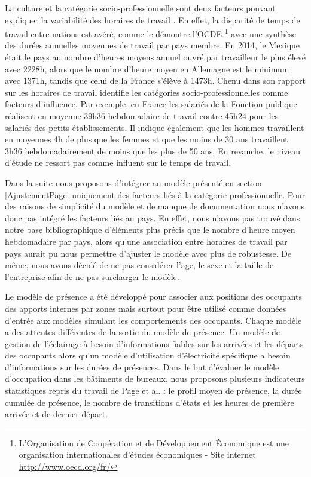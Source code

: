 La culture et la catégorie socio-professionnelle sont deux facteurs pouvant expliquer la variabilité des horaires de travail \cite{Annex-53-1}. En effet, la disparité de temps de travail entre nations est avéré, comme le démontre l'OCDE \footnote{L'Organisation de Coopération et de Développement Économique est une organisation internationales d'études économiques - Site internet \url{http://www.oecd.org/fr/}}\cite{OECD-14} avec une synthèse des durées annuelles moyennes de travail par pays membre. En 2014, le Mexique était le pays au nombre d'heures moyens annuel ouvré par travailleur le plus élevé avec 2228h, alors que le nombre d'heure moyen en Allemagne est le minimum avec 1371h, tandis que celui de la France s'élève à 1473h. Chenu \cite{Chenu-02} dans son rapport sur les horaires de travail identifie les catégories socio-professionnelles comme facteurs d'influence. Par exemple, en France les salariés de la Fonction publique réalisent en moyenne 39h36 hebdomadaire de travail contre 45h24 pour les salariés des petits établissements. Il indique également que les hommes travaillent en moyennes 4h de plus que les femmes et que les moins de 30 ans travaillent 3h36 hebdomadairement de moins que les plus de 50 ans. En revanche, le niveau d'étude ne ressort pas comme influent sur le temps de travail.

Dans la suite nous proposons d'intégrer au modèle présenté en section \ref{AjustementPage} uniquement des facteurs liés à la catégorie professionnelle. Pour des raisons de simplicité du modèle et de manque de documentation nous n'avons donc pas intégré les facteurs liés au pays. En effet, nous n'avons pas trouvé dans notre base bibliographique d'éléments plus précis que le nombre d'heure moyen hebdomadaire par pays, alors qu'une association entre horaires de travail par pays aurait pu nous permettre d'ajuster le modèle avec plus de robustesse. De même, nous avons décidé de ne pas considérer l'age, le sexe et la taille de l'entreprise afin de ne pas surcharger le modèle.

Le modèle de présence a été développé pour associer aux positions des occupants des apports internes par zones mais surtout pour être utilisé comme données d'entrée aux modèles simulant les comportements des occupants. Chaque modèle a des attentes différentes de la sortie du modèle de présence. Un modèle de gestion de l'éclairage à besoin d'informations fiables sur les arrivées et les départs des occupants alors qu'un modèle d'utilisation d'électricité spécifique a besoin d'informations sur les durées de présences. Dans le but d'évaluer le modèle d'occupation dans les bâtiments de bureaux, nous proposons plusieurs indicateurs statistiques repris du travail de Page et al. \cite{Page-08}: le profil moyen de présence, la durée cumulée de présence, le nombre de transitions d'états et les heures de première arrivée et de dernier départ.

